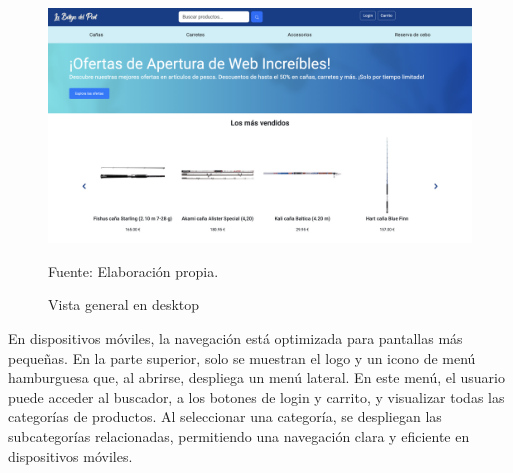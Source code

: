\begin{figure}[H]
\begin{center}
\includegraphics[scale=0.3]{./Images/vistaDesktop.png}
\caption{Vista general en desktop} Fuente: Elaboración propia.

\label{fig:fig2}

\end{center}
\end{figure}

En dispositivos móviles, la navegación está optimizada para pantallas más pequeñas. En la parte superior, solo se muestran el logo y un icono de menú hamburguesa que, al abrirse, despliega un menú lateral. En este menú, el usuario puede acceder al buscador, a los botones de login y carrito, y visualizar todas las categorías de productos. Al seleccionar una categoría, se despliegan las subcategorías relacionadas, permitiendo una navegación clara y eficiente en dispositivos móviles.

